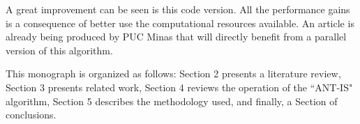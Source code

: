 A great improvement can be seen is this code version. All the performance gains is a consequence of better use the computational resources available. An article is already being produced by PUC Minas that will directly benefit from a parallel version of this algorithm.

This monograph is organized as follows: Section 2 presents a literature review, Section 3 presents related work, Section 4 reviews the operation of the ``ANT-IS" algorithm, Section 5 describes the methodology used, and finally, a Section of conclusions.
